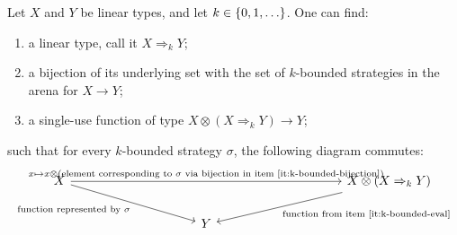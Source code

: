 \begin{lemma}\label{lem:linear-type-of-k-bounded-strategies}
    Let $X$ and $Y$ be linear types, and let $k \in \{0,1,\ldots\}$. One can find: 
    \begin{enumerate}
        \item \label{it:k-bounded-type} a linear type, call it $X \Rightarrow_k Y$;
        \item \label{it:k-bounded-bijection} a bijection of its underlying set with the set of $k$-bounded strategies in the arena for $X \to Y$;
        \item \label{it:k-bounded-eval} a single-use function of type $X \otimes (X \Rightarrow_k Y) \to Y$;\end{enumerate}
    such that for every $k$-bounded strategy $\sigma$, the following diagram commutes:
    \[
    \begin{tikzcd}[column sep=3.5cm]
    X  
    \ar[rr,"{x \mapsto x \otimes \text{(element corresponding to $\sigma$ via bijection in item~\ref{it:k-bounded-bijection}})}"]
    \ar[dr,"{\text{function represented by $\sigma$}}"']
    & & 
    X \otimes (X \Rightarrow_k Y)
    \ar[dl,"\text{function from item~\ref{it:k-bounded-eval}}"]
    \\
    & Y
    \end{tikzcd}
    \]    
\end{lemma}




